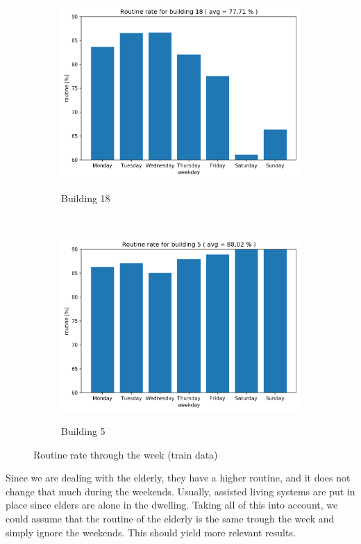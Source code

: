 \begin{figure}[H]
    \begin{subfigure}{.5\textwidth}
		\caption{Building 18}
		\includegraphics[width=1\linewidth]{../Figures/EC/b18week.png}
		\label{fig:ec_b18week}
	\end{subfigure}%
    ~ 
    \begin{subfigure}{.5\textwidth}
		\caption{Building 5}
		\includegraphics[width=1\linewidth]{../Figures/EC/b5weekd.png}
		\label{fig:ec_b5week}
	\end{subfigure}%
	\caption{Routine rate through the week (train data)}
    \label{fig:ec_week}
\end{figure}


Since we are dealing with the elderly, they have a higher routine, and it does not change that much during the weekends. 
Usually, assisted living systems are put in place since elders are alone in the dwelling.
Taking all of this into account, we could assume that the routine of the elderly is the same trough the week and simply ignore the weekends. 
This should yield more relevant results. 

